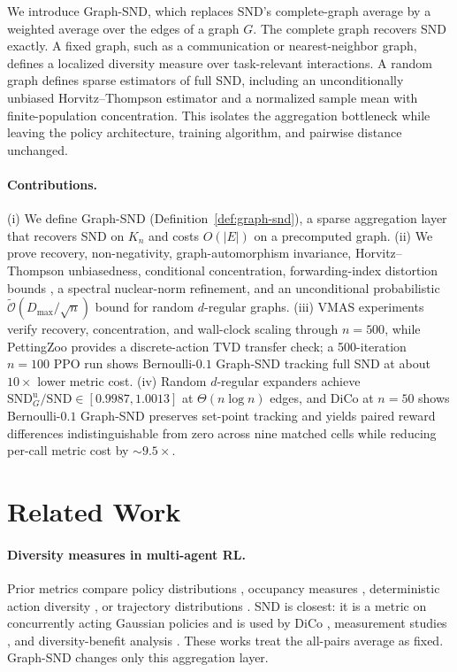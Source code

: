 \documentclass{article}
\theoremstyle{plain}
\theoremstyle{definition}
\theoremstyle{remark}
\newcommand{\SND}{\ensuremath{\mathrm{SND}}}
\newcommand{\SNDG}{\mathrm{SND}_{G}}
\begin{document}
We introduce Graph-SND, which replaces SND's complete-graph average by a
weighted average over the edges of a graph $G$. The complete graph recovers
SND exactly. A fixed graph, such as a communication or nearest-neighbor
graph, defines a localized diversity measure over task-relevant
interactions. A random graph defines sparse estimators of full SND,
including an unconditionally unbiased Horvitz--Thompson estimator and a
normalized sample mean with finite-population concentration. This isolates
the aggregation bottleneck while leaving the policy architecture, training
algorithm, and pairwise distance unchanged.

\paragraph{Contributions.}
(i) We define Graph-SND (Definition~\ref{def:graph-snd}), a sparse
aggregation layer that recovers SND on $K_n$ and costs $O(|E|)$ on a
precomputed graph. (ii) We prove recovery, non-negativity,
graph-automorphism invariance, Horvitz--Thompson unbiasedness,
conditional concentration, forwarding-index distortion bounds
\citep{heydemann1989forwarding,leighton1999multicommodity}, a
spectral nuclear-norm refinement, and an unconditional probabilistic
$\widetilde{\mathcal{O}}(D_{\max}/\sqrt{n})$ bound for random
$d$-regular graphs. (iii) VMAS experiments
\citep{bettini2022vmas} verify recovery, concentration, and wall-clock
scaling through $n=500$, while PettingZoo provides a discrete-action
TVD transfer check; a 500-iteration $n=100$ PPO run
shows Bernoulli-$0.1$ Graph-SND tracking full SND at about $10\times$
lower metric cost. (iv) Random $d$-regular expanders achieve
$\SNDG^{\mathrm{u}}/\SND\in[0.9987,1.0013]$ at
$\Theta(n\log n)$ edges, and DiCo at $n=50$ shows Bernoulli-$0.1$
Graph-SND preserves set-point tracking and yields paired reward differences indistinguishable from zero across nine matched cells while reducing per-call metric cost by ${\sim}9.5\times$.

\section{Related Work}
\label{sec:related}

\paragraph{Diversity measures in multi-agent RL.}
Prior metrics compare policy distributions
\citep{mckee2022diversity,yu2021informative,hu2022policy}, occupancy
measures \citep{liu2021unifying}, deterministic action diversity
\citep{parker-holder2020effective}, or trajectory distributions
\citep{lupu2021trajedi}. SND \citep{bettini2025snd} is closest: it is a
metric on concurrently acting Gaussian policies and is used by DiCo
\citep{bettini2024dico}, measurement studies
\citep{bettini2024impact,tessera2024hypermarl}, and diversity-benefit
analysis \citep{amir2025diversity}. These works treat the all-pairs
average as fixed. Graph-SND changes only this aggregation layer.
\end{document}
